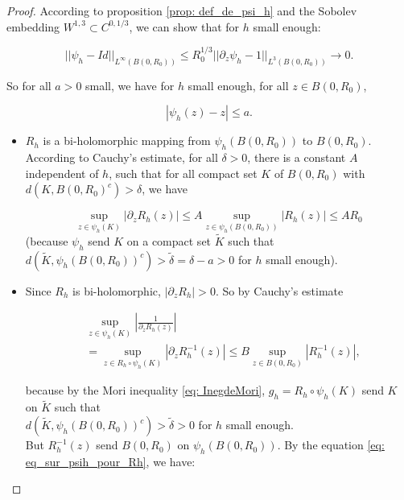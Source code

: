 \documentclass[10pt,a4paper]{amsart}
\newcommand{\nn}{\nonumber}
\begin{document}
	\begin{proof}
		
		
		According to proposition \ref{prop: def_de_psi_h} and the Sobolev embedding  $W^{1,3}\subset C^{0,1/3}$, we can show that for $h$ small enough:
		
		\begin{equation}
			||\psi_h- Id||_{L^\infty(B(0,R_0))}\leq R_0^{1/3}||\partial_z\psi_h-1||_{L^3(B(0,R_0))}\longrightarrow 0.
		\end{equation}
		
		So for all $a>0$ small, we have for $h$ small enough, for all $z\in B(0,R_0)$,
		
		\begin{equation}
			\label{eq: eq_sur_psih_pour_Rh}
			|\psi_h(z)-z|\leq a.
		\end{equation} 
		
		\begin{itemize}
			
			\item $R_h$ is a bi-holomorphic mapping from $\psi_h(B(0,R_0))$ to $B(0,R_0)$. According to Cauchy's estimate, for all $\delta>0$, there is a constant $A$ independent of $h$, such that for all compact set $K$ of $B(0,R_0)$ with $d(K, B(0,R_0)^c)>\delta$, we have
			
			\begin{equation}
				\sup_{z\in \psi_h(K)}|\partial_z R_h(z)| \leq A \sup_{z\in \psi_h(B(0,R_0))}|R_h(z)|\leq A R_0
			\end{equation}
			(because $\psi_h$ send $K$ on a compact set $\tilde{K}$ such that  $d(\tilde{K}, \psi_h(B(0,R_0))^c)>\tilde{\delta}=\delta-a>0$ for $h$ small enough).
			
			
			\item Since $R_h$ is bi-holomorphic, $|\partial_z R_h|>0$. So by Cauchy's estimate
			
			\begin{align}
				&\sup_{z\in \psi_h(K)}\left|\frac{1}{\partial_z R_h(z)}\right|\nn\\
				&= \sup_{z\in R_h\circ\psi_h(K)}|\partial_z R_h^{-1}(z)|\leq B \sup_{z\in B(0,R_0)} | R_h^{-1}(z)|,
			\end{align}
			
			because by the Mori inequality \ref{eq: InegdeMori}, $g_h=R_h\circ\psi_h(K)$ send $K$ on $\tilde{K}$ such that\\ $d(\tilde{K}, \psi_h(B(0,R_0))^c)>\tilde{\delta}>0$ for $h$ small enough.\\
			But $ R_h^{-1}(z)$ send $B(0,R_0)$ on $\psi_h(B(0,R_0))$. By the equation \ref{eq: eq_sur_psih_pour_Rh}, we have:
			

\end{itemize}
\end{proof}
\end{document}
